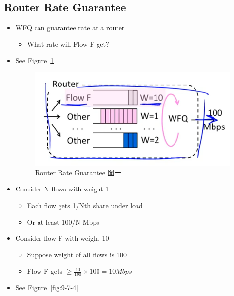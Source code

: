 \documentclass[12pt]{ctexart}   %
\begin{document}
	\subsection{Router Rate Guarantee}
	\begin{itemize}
		\item WFQ can guarantee rate at a router
		\begin{itemize}
			\item What rate will Flow F get?
		\end{itemize}
		\item See Figure~\ref{fig:9-7-3}
		  
		\begin{figure}[h!] %
		\centering
		\includegraphics[scale=0.7]{images/9-7-3}
		\caption{ Router Rate Guarantee 图一}
		\label{fig:9-7-3}
		\end{figure}

		\item  Consider N flows with weight 1
		\begin{itemize}
			\item Each flow gets 1/Nth share under load
			\item Or at least 100/N Mbps
		\end{itemize}
		
		\item Consider flow F with weight 10
		\begin{itemize}
			\item Suppose weight of all flows is 100
			\item Flow F gets $\geqslant \frac{10}{100} \times 100 = 10 Mbps$
		\end{itemize}
		\item See Figure~\ref{fig:9-7-4}
		  

\end{itemize}
\end{document}
